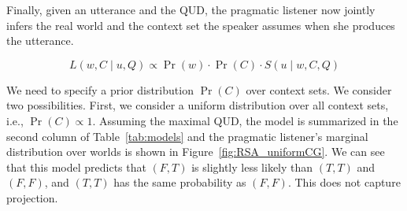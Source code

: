 Finally, given an utterance and the QUD, the pragmatic listener now jointly infers 
 the real world and the context set the speaker assumes when she produces the utterance. 

\begin{equation}
L(w, C \mid u, Q) \propto \Pr(w) \cdot \Pr(C) \cdot S(u \mid w, C, Q)
\end{equation}

We need to specify a prior distribution $\Pr(C)$ 
 over context sets.
We consider two possibilities. 
First, we consider a uniform distribution over all context sets, i.e., 
 $\Pr(C)\propto 1$.
Assuming the maximal QUD, the model is summarized in the second column of 
 Table~\ref{tab:models} and the pragmatic listener's marginal distribution over 
 worlds is shown in Figure~\ref{fig:RSA_uniformCG}.
We can see that this model predicts that $(F, T)$ is slightly 
 less likely than $(T, T)$ and $(F, F)$, 
 and $(T, T)$ has the same probability as $(F, F)$. 
This does not capture projection.


